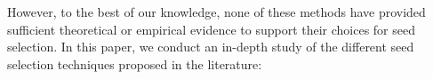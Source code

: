 However, to the best of our knowledge, none of these methods have provided sufficient theoretical or empirical evidence to support their choices for seed selection. In this paper, we conduct an in-depth study of the different seed selection techniques proposed in the literature:
%



